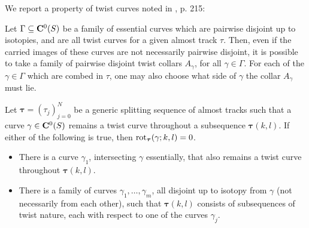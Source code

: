 \begin{rmk}\label{rmk:twist_disjointness}
We report a property of twist curves noted in \cite{mosher}, p. 215:
\begin{claim}
Let $\Gamma\subseteq \mathbf C^0(S)$ be a family of essential curves which are pairwise disjoint up to isotopies, and are all twist curves for a given almost track $\tau$. Then, even if the carried images of these curves are not necessarily pairwise disjoint, it is possible to take a family of pairwise disjoint twist collars $A_\gamma$, for all $\gamma\in\Gamma$. For each of the $\gamma\in\Gamma$ which are combed in $\tau$, one may also choose what side of $\gamma$ the collar $A_\gamma$ must lie.
\end{claim}
\end{rmk}

\begin{lemma}\label{lem:smallinterference}
Let $\bm\tau=(\tau_j)_{j=0}^N$ be a generic splitting sequence of almost tracks such that a curve $\gamma\in \mathbf C^0(S)$ remains a twist curve throughout a subsequence $\bm\tau(k,l)$. If either of the following is true, then $\mathrm{rot}_{\bm\tau}(\gamma;k,l)=0$.
\begin{itemize}
\item There is a curve $\gamma_1$, intersecting $\gamma$ essentially, that also remains a twist curve throughout $\bm\tau(k,l)$.
\item There is a family of curves $\gamma_1,\ldots,\gamma_m$, all disjoint up to isotopy from $\gamma$ (not necessarily from each other), such that $\bm\tau(k,l)$ consists of subsequences of twist nature, each with respect to one of the curves $\gamma_j$.
\end{itemize}
\end{lemma}

